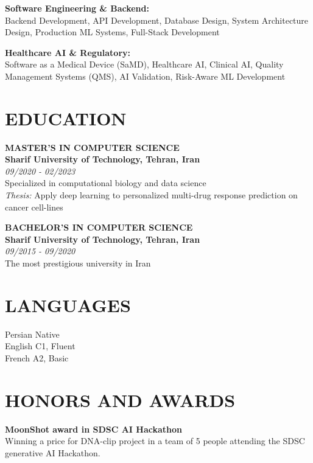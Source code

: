 \documentclass[9pt, letterpaper]{extarticle}
\begin{document}
\begin{minipage}[t]{0.32\textwidth}
\vspace{0.08cm}
\textbf{Software Engineering \& Backend:} \\[0.025cm]
Backend Development, API Development, Database Design, System Architecture Design, Production ML Systems, Full-Stack Development

\vspace{0.08cm}
\textbf{Healthcare AI \& Regulatory:} \\[0.025cm]
Software as a Medical Device (SaMD), Healthcare AI, Clinical AI, Quality Management Systems (QMS), AI Validation, Risk-Aware ML Development

\section{EDUCATION}
\small

\textbf{MASTER'S IN COMPUTER SCIENCE} \\[0.025cm]
\textbf{Sharif University of Technology, Tehran, Iran} \\[0.025cm]
\textit{09/2020 - 02/2023} \\[0.025cm]
Specialized in computational biology and data science \\[0.025cm]
\textit{Thesis:} Apply deep learning to personalized multi-drug response prediction on cancer cell-lines

\vspace{0.12cm}
\textbf{BACHELOR'S IN COMPUTER SCIENCE} \\[0.025cm]
\textbf{Sharif University of Technology, Tehran, Iran} \\[0.025cm]
\textit{09/2015 - 09/2020} \\[0.025cm]
The most prestigious university in Iran

\section{LANGUAGES}
\small

Persian Native \\[0.025cm]
English C1, Fluent \\[0.025cm]
French A2, Basic

\section{HONORS AND AWARDS}
\small

\textbf{MoonShot award in SDSC AI Hackathon} \\[0.025cm]
Winning a price for DNA-clip project in a team of 5 people attending the SDSC generative AI Hackathon.


\end{minipage}
\end{document}

